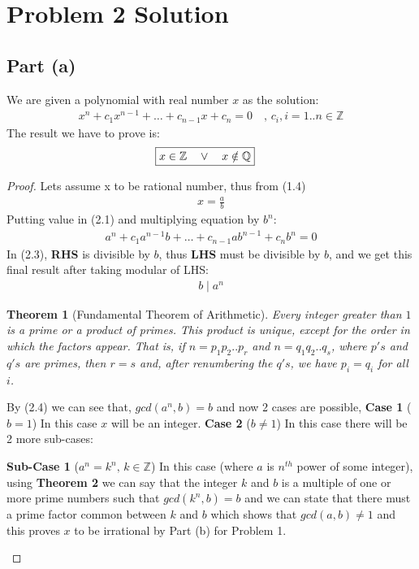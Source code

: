 \documentclass{article}
\newtheorem{theorem}{Theorem}
\newenvironment{myenv}{\begin{adjustwidth}{1cm}{}}{\end{adjustwidth}}
\begin{document}
\section{Problem 2 Solution}{
  \subsection{Part (a)}{
    We are given a polynomial with real number $x$ as the solution:
    \begin{align}
      x^n+c_1x^{n-1}+\dots+c_{n-1}x+c_n=0 \quad ,\, c_i,i=1..n \in \mathbb{Z} \label{eq:1}
    \end{align}
    The result we have to prove is:
    \begin{align}
      \Aboxed{x \in \mathbb{Z} \quad \vee \quad x \notin \mathbb{Q}} \label{eq:2}
    \end{align}
    \begin{proof}
      Lets assume x to be rational number, thus from (1.4)
      \begin{align*}
        x=\frac{a}{b}
      \end{align*}
      Putting value in (2.1) and multiplying equation by $b^n$:
      \begin{align}
        a^n+c_1a^{n-1}b+\dots+c_{n-1}ab^{n-1}+c_nb^n=0 \label{eq:3}
      \end{align}
      In (2.3), \textbf{RHS} is divisible by $b$, thus \textbf{LHS} must be divisible by $b$, and we get this final result after taking modular of LHS:
      \begin{align}
        b \mid a^n \label{eq:4}
      \end{align}
      \begin{theorem}[Fundamental Theorem of Arithmetic]
        Every integer greater than $1$ is a prime or a product of primes. This product is unique, except for the order in which the factors appear. That is, if $n=p_1p_2..p_r$ and $n=q_1q_2..q_s$, where $p's$ and $q's$ are primes, then $r=s$ and, after renumbering the $q's$, we have $p_i=q_i$ for all $i$.
      \end{theorem}
      By (2.4) we can see that, $gcd(a^n,b)=b$ and now 2 cases are possible, \newline
      \textbf{Case 1} ($b=1$) In this case $x$ will be an integer. \newline
      \textbf{Case 2} ($b\ne1$) In this case there will be 2 more sub-cases: \newline
      \begin{myenv}
         \textbf{Sub-Case 1} ($a^n=k^n ,\, k \in \mathbb{Z}$) \quad In this case (where $a$ is $n^{th}$ power of some integer), using \textbf{Theorem 2} we can say that the integer $k$ and $b$ is a multiple of one or more prime numbers such that $gcd(k^n,b)=b$ and we can state that there must a prime factor common between $k$ and $b$ which shows that $gcd(a,b)\ne1$ and this proves $x$ to be irrational by Part (b) for Problem 1. \newline

\end{myenv}
\end{proof}}}
\end{document}
